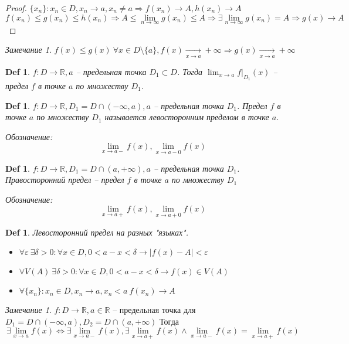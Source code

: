 \documentclass[12pt]{article}
\newenvironment{MyItemize}[1][4pt]{
  \begin{itemize}
  \setlength{\parskip}{0pt}
  \setlength{\itemsep}{#1}
}{       
  \end{itemize}
}
\def\R{\mathbb{R}}       %
\def\SO{\Rightarrow}     %
\def\EQ{\Leftrightarrow} %
\def\Pagebreak{\pagebreak\vspace*{-1.5em}}
\theoremstyle{definition} %
\theoremstyle{plain} %
\newtheorem{Def}[Thm]{Def} %
\theoremstyle{remark} %
\newtheorem{Rem}[Thm]{Замечание} %
\begin{document}
\begin{proof}
    $\{x_n\} : x_n \in D, x_n \to a, x_n \neq a \SO f(x_n) \to A, h(x_n) \to A$
    \[f(x_n) \leqslant g(x_n) \leqslant h(x_n) \SO A \leqslant \lim_{n \to \infty} g(x_n) \leqslant A \SO \exists \lim_{n \to \infty} g(x_n) = A \SO g(x) \to A\] 
\end{proof}

\begin{Rem}
    $f(x) \leqslant g(x) \ \forall x \in D \setminus \{a\}, f(x) \xrightarrow[x \to a]{} +\infty \SO g(x) \xrightarrow[x \to a]{} +\infty$ 
\end{Rem}

\Pagebreak
\begin{Def}
    $f : D \to \R, a$ -- предельная точка $D_1 \subset D$. Тогда $\lim_{x \to a} f|_{D_1} (x)$ -- предел $f$ в точке $a$ по множеству $D_1$. 
\end{Def}

\begin{Def}
    $f: D \to \R, D_1 = D \cap (-\infty, a), a$ -- предельная точка $D_1$. Предел $f$ в точке $a$ по множеству $D_1$ называется левосторонним пределом в точке $a$.

    Обозначение: 
    \[\lim_{x \to a-} f(x), \lim_{x \to a - 0} f(x)\]
\end{Def}

\begin{Def}
    $f: D \to \R, D_1 = D \cap (a, +\infty), a$ -- предельная точка $D_1$. Правосторонний предел -- предел $f$ в точке $a$ по множеству $D_1$
    
    Обозначение:
    \[\lim_{x \to a+} f(x), \lim_{x \to a + 0} f(x)\]
\end{Def}

\begin{Def}
    Левосторонний предел на разных "языках".
    \begin{MyItemize}
        \item $\forall \varepsilon \ \exists \delta > 0 : \forall x \in D, 0 < a - x < \delta \to |f(x) - A| < \varepsilon$
        \item $\forall V(A) \ \exists \delta > 0 : \forall x \in D, 0 < a - x < \delta \to f(x) \in V(A)$
        \item $\forall \{x_n\} : x_n \in D, x_n \to a, x_n < a \ f(x_n) \to A$  
    \end{MyItemize}
\end{Def}

\begin{Rem}
    $f: D \to \R, a \in \R$ -- предельная точка для $D_1 = D \cap (-\infty, a), D_2 = D \cap (a, +\infty)$
    Тогда 
    \[\exists \lim_{x \to a} f(x) \EQ \exists \lim_{x \to a-} f(x), \exists \lim_{x \to a+} f(x) \wedge \lim_{x \to a-} f(x) = \lim_{x \to a+} f(x)\]  
\end{Rem}
\end{document}
